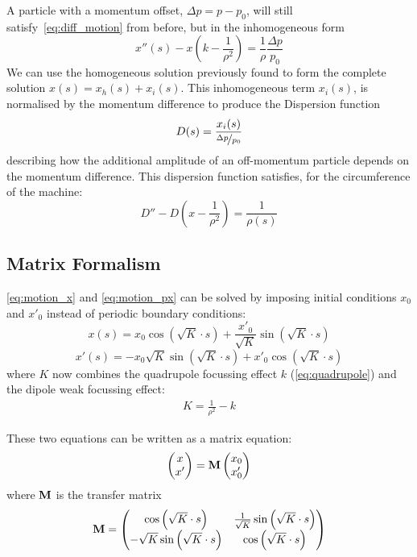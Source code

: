 \documentclass[a4paper,twoside,11pt]{report}
\begin{document}
A particle with a momentum offset, $\Delta p = p-p_0$, will still satisfy~\ref{eq:diff_motion} from before, but in the inhomogeneous form
\begin{equation}
  x''(s)-x\left(k-\frac 1{\rho^2}\right)=\frac 1\rho\frac{\Delta p}{p_0}
\end{equation}
We can use the homogeneous solution previously found to form the complete solution $x(s)=x_h(s)+x_i(s)$. This inhomogeneous term $x_i(s)$, is normalised by the momentum difference to produce the Dispersion function
\begin{equation}
  D(s)=\frac{x_i(s)}{\nicefrac{\Delta p}{p_0}}
  \label{eq:dispersion}
\end{equation} describing how the additional amplitude of an off-momentum particle depends on the momentum difference. 
This dispersion function satisfies, for the circumference of the machine:
\begin{equation}
  D''-D\left(x-\frac1{\rho^2}\right)=\frac 1{\rho(s)}
\end{equation}

\subsection{Matrix Formalism}\label{sec:matrix}

\autoref{eq:motion_x} and \autoref{eq:motion_px} can be solved by imposing initial conditions $x_0$ and $x'_0$ instead of periodic boundary conditions:
\begin{equation}
  x(s)=x_0\cos\left(\sqrt{K}\cdot s\right)+\frac{x'_0}{\sqrt{K}}\sin\left(\sqrt{K}\cdot s\right)
\end{equation}
\begin{equation}
  x'(s)=-x_0\sqrt{K}\sin\left(\sqrt{K}\cdot s\right)+x'_0\cos\left(\sqrt{K}\cdot s\right)
\end{equation}
where $K$ now combines the quadrupole focussing effect $k$ (\autoref{eq:quadrupole}) and the dipole weak focussing effect:
\begin{eqnarray}
  K=\frac1{\rho^2}-k
\end{eqnarray}

These two equations can be written as a matrix equation:
\begin{equation}
  \begin{pmatrix}
    x \\
    x'
  \end{pmatrix}
  =
  \bf{M}
  \begin{pmatrix}
    x_0 \\
    x'_0
  \end{pmatrix}
\end{equation}
where $\bf{M}$ is the transfer matrix
\begin{equation}
  \bf{M}=
  \begin{pmatrix}
    \cos\left(\sqrt{K}\cdot s\right) & \frac1{\sqrt{K}}\sin\left(\sqrt{K}\cdot s\right) \\
    -\sqrt{K}\sin\left(\sqrt{K}\cdot s\right) & \cos\left(\sqrt{K}\cdot s\right)
  \end{pmatrix}
\end{equation}
\end{document}
